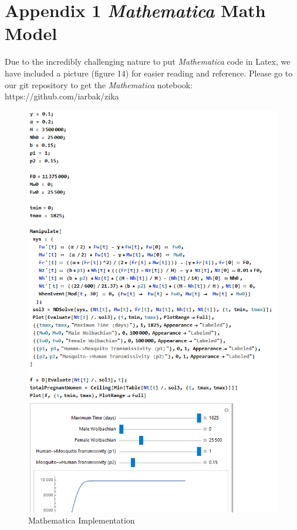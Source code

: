 \documentclass{article}
\begin{document}
\section{Appendix 1 \textit{Mathematica} Math Model}
Due to the incredibly challenging nature to put \textit{Mathematica} code in Latex, we have included a picture (figure 14) for easier reading and reference. Please go to our git repository to get the \textit{Mathematica} notebook: https://github.com/iarbak/zika
\begin{figure}[H]
  \includegraphics[width=\linewidth]{mathematica}
  \caption{Mathematica Implementation}
  \label{fig:math}
\end{figure}
\end{document}
